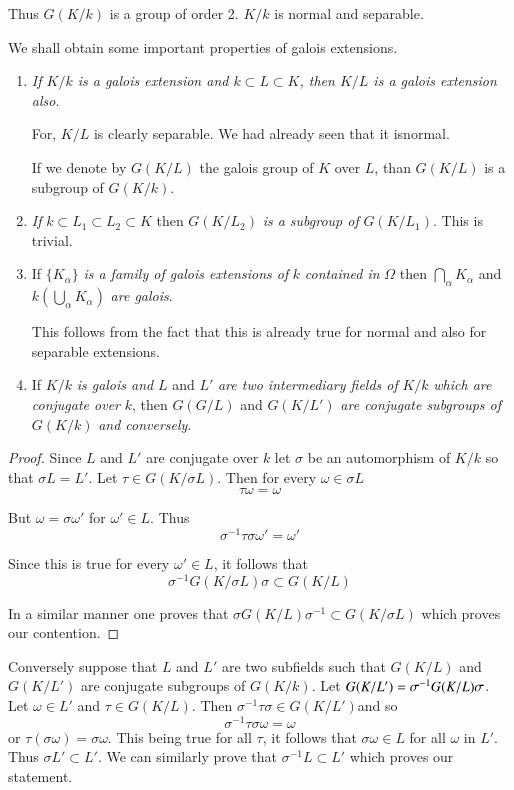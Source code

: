 Thus $G(K/k)$ is a group of order 2. $K/k$ is normal and separable.

We shall obtain some important properties of galois extensions.	
\begin{enumerate}[1)]
\item \textit{If $K/k$ is a galois extension and $k \subset L
  \subset K$, then $K/L$ is a galois extension also}. 

For, $K/L$ is clearly separable. We had already seen that it
is\pageoriginale normal. 

If we denote by $G(K /L)$ the galois group of $K$ over $L$, than
$G(K/L)$ is a subgroup of $G(K/k)$.  

\item \textit{If} $k \subset L_1 \subset L_2 \subset K$ then
  $G(K/L_2)$ \textit{is a subgroup of } $G(K / L_1)$. This is
  trivial. 

\item If $\{ K_\alpha \}$ \textit{is a family of galois extensions
  of} $k$ \textit{contained in} $\Omega$ then $\bigcap \limits_\alpha
  K_\alpha$ and $k (\bigcup \limits_{\alpha} K_\alpha)$ \textit{are
    galois}. 

This follows from the fact that this is already true for normal and
also for separable extensions. 

\item If $K/k$ \textit{is galois and} $L$ and $L'$ \textit{are two
  intermediary fields of} $K/k$ \textit{which are conjugate over} $k$,
  then $G(G/L)$ and $G(K/L')$ \textit{are conjugate subgroups of
  } $G(K/k)$ \textit{and conversely}. 
\end{enumerate}

\begin{proof}
Since $L$ and $L'$ are conjugate over $k$ let $\sigma$ be an
automorphism of $K/k$ so that $\sigma L = L'$. Let $\tau \in
G(K/\sigma L)$. Then for every $\omega \in \sigma L$ 
$$
\tau \omega = \omega
$$

But $\omega = \sigma \omega'$ for $\omega' \in L$. Thus
$$
\sigma^{-1} \tau \sigma \omega' = \omega'
$$

Since this is true for every $\omega' \in L$, it follows that  
$$
\sigma^{-1} G(K/\sigma L )\sigma \subset G(K/L)
$$

In a similar manner one proves that $\sigma G(K/L)\sigma^{-1} \subset
G(K/ \sigma L)$ which proves our contention. 
\end{proof}


Conversely suppose that $L$ and $L'$ are two subfields such that
$G(K/L)$ and $G(K/L')$ are conjugate subgroups of $G(K/k)$. 
Let $G(K/L') = \sigma^{-1}\break G(K/L) \sigma$. Let $\omega \in L'$ and $\tau
\in G(K/L)$. Then $\sigma^{-1} \tau \sigma \in G(K/L')$\pageoriginale and so  
$$
\sigma^{-1} \tau \sigma \omega = \omega
$$
or $\tau(\sigma \omega) = \sigma \omega$. This being true for all
$\tau$, it follows that $\sigma \omega \in L$ for all $\omega$ in
$L'$. Thus $\sigma L' \subset L'$. We can similarly prove that
$\sigma^{-1} L \subset L'$ which proves our statement. 

